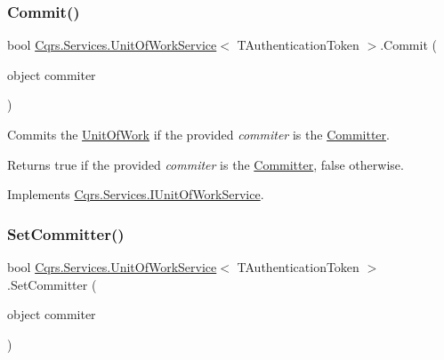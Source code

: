 \subsubsection{\texorpdfstring{Commit()}{Commit()}}
{\footnotesize\ttfamily bool \hyperlink{classCqrs_1_1Services_1_1UnitOfWorkService}{Cqrs.\+Services.\+Unit\+Of\+Work\+Service}$<$ T\+Authentication\+Token $>$.Commit (\begin{DoxyParamCaption}\item[{object}]{commiter }\end{DoxyParamCaption})}



Commits the \hyperlink{classCqrs_1_1Services_1_1UnitOfWorkService_a1ba76512e37e5006c2b65d071803e99f}{Unit\+Of\+Work} if the provided {\itshape commiter}  is the \hyperlink{classCqrs_1_1Services_1_1UnitOfWorkService_aabeccb6ba949fe02b8676b324f85950b}{Committer}. 

\begin{DoxyReturn}{Returns}
true if the provided {\itshape commiter}  is the \hyperlink{classCqrs_1_1Services_1_1UnitOfWorkService_aabeccb6ba949fe02b8676b324f85950b}{Committer}, false otherwise. 
\end{DoxyReturn}


Implements \hyperlink{interfaceCqrs_1_1Services_1_1IUnitOfWorkService_a3bd8a6a931fc6f457d136d979d26cead}{Cqrs.\+Services.\+I\+Unit\+Of\+Work\+Service}.

\mbox{\label{classCqrs_1_1Services_1_1UnitOfWorkService_a663471bc62f79df22c800ad683a27f59}} 
\subsubsection{\texorpdfstring{Set\+Committer()}{SetCommitter()}}
{\footnotesize\ttfamily bool \hyperlink{classCqrs_1_1Services_1_1UnitOfWorkService}{Cqrs.\+Services.\+Unit\+Of\+Work\+Service}$<$ T\+Authentication\+Token $>$.Set\+Committer (\begin{DoxyParamCaption}\item[{object}]{commiter }\end{DoxyParamCaption})}



